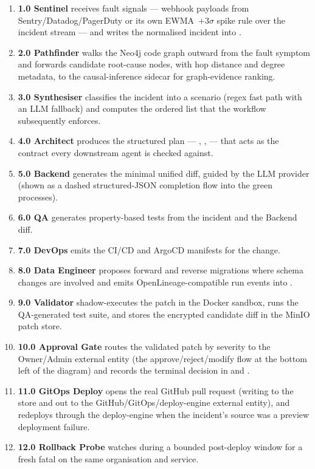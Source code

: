 \begin{enumerate}[itemsep=2pt]
  \item \textbf{1.0 Sentinel} receives fault signals --- webhook payloads
        from Sentry/Datadog/PagerDuty or its own EWMA~$+3\sigma$ spike rule
        over the incident stream --- and writes the normalised incident into
        .
  \item \textbf{2.0 Pathfinder} walks the Neo4j code graph outward from the
        fault symptom and forwards candidate root-cause nodes, with hop
        distance and degree metadata, to the causal-inference sidecar for
        graph-evidence ranking.
  \item \textbf{3.0 Synthesiser} classifies the incident into a scenario
        (regex fast path with an LLM fallback) and computes the ordered
         list that the workflow subsequently enforces.
  \item \textbf{4.0 Architect} produces the structured plan ---
        , ,  ---
        that acts as the contract every downstream agent is checked against.
  \item \textbf{5.0 Backend} generates the minimal unified diff, guided by
        the LLM provider (shown as a dashed structured-JSON completion flow
        into the green processes).
  \item \textbf{6.0 QA} generates property-based tests from the incident and
        the Backend diff.
  \item \textbf{7.0 DevOps} emits the CI/CD and ArgoCD manifests for the
        change.
  \item \textbf{8.0 Data Engineer} proposes forward and reverse migrations
        where schema changes are involved and emits
        OpenLineage-compatible run events \cite{openlineage} into
        .
  \item \textbf{9.0 Validator} shadow-executes the patch in the Docker
        sandbox, runs the QA-generated test suite, and stores the encrypted
        candidate diff in the MinIO patch store.
  \item \textbf{10.0 Approval Gate} routes the validated patch by severity
        to the Owner/Admin external entity (the approve/reject/modify flow
        at the bottom left of the diagram) and records the terminal decision
        in  and .
  \item \textbf{11.0 GitOps Deploy} opens the real GitHub pull request
        (writing to the  store and out to the
        GitHub/GitOps/deploy-engine external entity), and redeploys through
        the deploy-engine when the incident's source was a preview
        deployment failure.
  \item \textbf{12.0 Rollback Probe} watches  during a
        bounded post-deploy window for a fresh fatal on the same
        organisation and service.
\end{enumerate}

